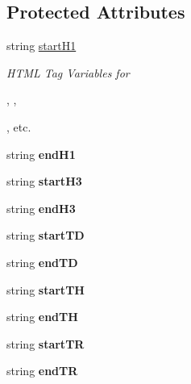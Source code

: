 \subsection*{Protected Attributes}
\begin{DoxyCompactItemize}
\item 
string \hyperlink{classHTMLTags_ae987289d0dab2e3e234048615f930d0f}{start\-H1}
\begin{DoxyCompactList}\small\item\em H\-T\-M\-L Tag Variables for 

, , 

, etc. \end{DoxyCompactList}\item 
\hypertarget{classHTMLTags_a708194dea85c068a24b7923254fd7458}{string {\bfseries end\-H1}}\label{classHTMLTags_a708194dea85c068a24b7923254fd7458}

\item 
\hypertarget{classHTMLTags_a9290221d987dfe55acd3d2002a48efa0}{string {\bfseries start\-H3}}\label{classHTMLTags_a9290221d987dfe55acd3d2002a48efa0}

\item 
\hypertarget{classHTMLTags_afa471891c94946ba4a68acd727246d66}{string {\bfseries end\-H3}}\label{classHTMLTags_afa471891c94946ba4a68acd727246d66}

\item 
\hypertarget{classHTMLTags_a827d77a9a5cc3c442421420f0713c17a}{string {\bfseries start\-T\-D}}\label{classHTMLTags_a827d77a9a5cc3c442421420f0713c17a}

\item 
\hypertarget{classHTMLTags_ac2f4aae38f9d88d90df443e1e59a5bfc}{string {\bfseries end\-T\-D}}\label{classHTMLTags_ac2f4aae38f9d88d90df443e1e59a5bfc}

\item 
\hypertarget{classHTMLTags_a71b8a6e9593c6744f75fe8fac83e39b7}{string {\bfseries start\-T\-H}}\label{classHTMLTags_a71b8a6e9593c6744f75fe8fac83e39b7}

\item 
\hypertarget{classHTMLTags_a12cc718fee6ac4d701aafa9bc6303ad3}{string {\bfseries end\-T\-H}}\label{classHTMLTags_a12cc718fee6ac4d701aafa9bc6303ad3}

\item 
\hypertarget{classHTMLTags_ae8ee5ce9589d18b36263d62c6aa30e0a}{string {\bfseries start\-T\-R}}\label{classHTMLTags_ae8ee5ce9589d18b36263d62c6aa30e0a}

\item 
\hypertarget{classHTMLTags_ae6b79efff5ed7c253a050a6179057942}{string {\bfseries end\-T\-R}}\label{classHTMLTags_ae6b79efff5ed7c253a050a6179057942}


\end{DoxyCompactItemize}
